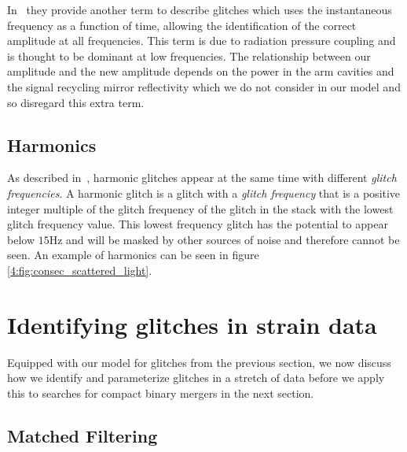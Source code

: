 In~\cite{Was_Subtract:2021} they provide another term to describe \scl{} glitches which uses the instantaneous frequency as a function of time, allowing the identification of the correct amplitude at all frequencies. This term is due to radiation pressure coupling and is thought to be dominant at low frequencies. The relationship between our amplitude and the new amplitude depends on the power in the arm cavities and the signal recycling mirror reflectivity which we do not consider in our model and so disregard this extra term.

\subsection{Harmonics}

As described in~\cite{TAccadia:2010}, harmonic glitches appear at the same time with different \emph{glitch frequencies}. A harmonic glitch is a glitch with a \emph{glitch frequency} that is a positive integer multiple of the glitch frequency of the glitch in the stack with the lowest glitch frequency value. This lowest frequency glitch has the potential to appear below $15$Hz and will be masked by other sources of noise and therefore cannot be seen. An example of harmonics can be seen in figure \ref{4:fig:consec_scattered_light}.

\section{\label{4:sec:search_techniques}Identifying \scl{} glitches in \gw{} strain data}

Equipped with our model for \scl{} glitches from the previous section, we now discuss how we identify and parameterize \scl{} glitches in a stretch of \gw{} data before we apply this to searches for compact binary mergers in the next section. 

\subsection{Matched Filtering \label{4:subsec:MF}}

